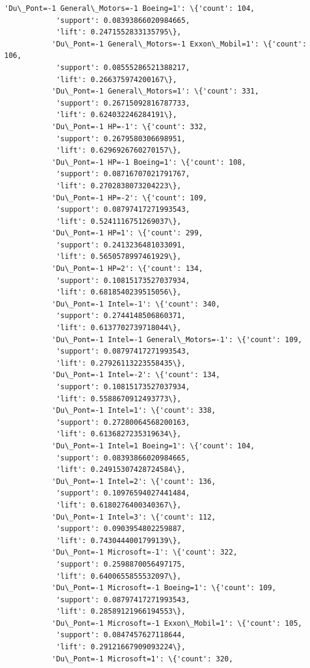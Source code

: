 \documentclass[11pt]{article}
\begin{document}
\begin{Verbatim}[commandchars=\\\{\}]
           'Du\_Pont=-1 General\_Motors=-1 Boeing=1': \{'count': 104,
            'support': 0.08393866020984665,
            'lift': 0.2471552833135795\},
           'Du\_Pont=-1 General\_Motors=-1 Exxon\_Mobil=1': \{'count': 106,
            'support': 0.08555286521388217,
            'lift': 0.266375974200167\},
           'Du\_Pont=-1 General\_Motors=1': \{'count': 331,
            'support': 0.26715092816787733,
            'lift': 0.624032246284191\},
           'Du\_Pont=-1 HP=-1': \{'count': 332,
            'support': 0.2679580306698951,
            'lift': 0.6296926760270157\},
           'Du\_Pont=-1 HP=-1 Boeing=1': \{'count': 108,
            'support': 0.08716707021791767,
            'lift': 0.2702838073204223\},
           'Du\_Pont=-1 HP=-2': \{'count': 109,
            'support': 0.08797417271993543,
            'lift': 0.5241116751269037\},
           'Du\_Pont=-1 HP=1': \{'count': 299,
            'support': 0.2413236481033091,
            'lift': 0.5650578997461929\},
           'Du\_Pont=-1 HP=2': \{'count': 134,
            'support': 0.10815173527037934,
            'lift': 0.6818540239515056\},
           'Du\_Pont=-1 Intel=-1': \{'count': 340,
            'support': 0.2744148506860371,
            'lift': 0.6137702739718044\},
           'Du\_Pont=-1 Intel=-1 General\_Motors=-1': \{'count': 109,
            'support': 0.08797417271993543,
            'lift': 0.27926113223558435\},
           'Du\_Pont=-1 Intel=-2': \{'count': 134,
            'support': 0.10815173527037934,
            'lift': 0.5588670912493773\},
           'Du\_Pont=-1 Intel=1': \{'count': 338,
            'support': 0.27280064568200163,
            'lift': 0.6136827235319634\},
           'Du\_Pont=-1 Intel=1 Boeing=1': \{'count': 104,
            'support': 0.08393866020984665,
            'lift': 0.24915307428724584\},
           'Du\_Pont=-1 Intel=2': \{'count': 136,
            'support': 0.10976594027441484,
            'lift': 0.6180276400340367\},
           'Du\_Pont=-1 Intel=3': \{'count': 112,
            'support': 0.0903954802259887,
            'lift': 0.7430444001799139\},
           'Du\_Pont=-1 Microsoft=-1': \{'count': 322,
            'support': 0.2598870056497175,
            'lift': 0.6400655855532097\},
           'Du\_Pont=-1 Microsoft=-1 Boeing=1': \{'count': 109,
            'support': 0.08797417271993543,
            'lift': 0.28589121966194553\},
           'Du\_Pont=-1 Microsoft=-1 Exxon\_Mobil=1': \{'count': 105,
            'support': 0.0847457627118644,
            'lift': 0.29121667909093224\},
           'Du\_Pont=-1 Microsoft=1': \{'count': 320,

\end{Verbatim}
\end{document}
